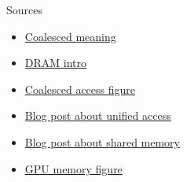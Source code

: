 \documentclass[11pt,t]{beamer}
\begin{document}
\begin{frame}{Sources}

\begin{itemize}
    \item \href{https://www.oxfordlearnersdictionaries.com/definition/english/coalesce?q=coalesced}{Coalesced meaning} 
    \item \href{https://www.youtube.com/watch?app=desktop&v=I-9XWtdW_Co}{DRAM intro}
    \item \href{https://www.researchgate.net/publication/265849053_A_GPU_Accelerated_Algorithm_for_Blood_Detection_inWireless_Capsule_Endoscopy_Images}{Coalesced access figure}
    \item \href{https://developer.nvidia.com/blog/unified-memory-cuda-beginners/}{Blog post about unified access}
    \item \href{https://developer.nvidia.com/blog/using-shared-memory-cuda-cc/}{Blog post about shared memory}
    \item \href{https://www.ce.jhu.edu/dalrymple/classes/602/Class13.pdf}{GPU memory figure}
\end{itemize}

\end{frame}
\end{document}
